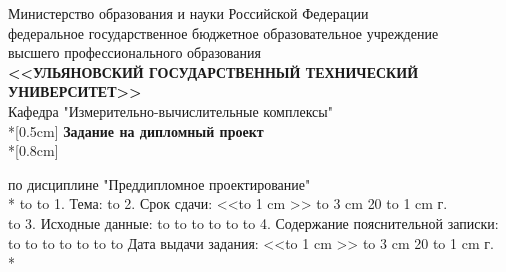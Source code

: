 \begin{titlepage}
\begin{center}
  \small
  Министерство образования и науки Российской Федерации\\
  федеральное государственное бюджетное образовательное учреждение\\
  высшего профессионального образования\\[0.5cm]
  \textbf{<<УЛЬЯНОВСКИЙ ГОСУДАРСТВЕННЫЙ ТЕХНИЧЕСКИЙ УНИВЕРСИТЕТ>>}\\[0.2cm]
  Кафедра "Измерительно-вычислительные комплексы"\\*[0.5cm]
  \normalsize
  \textbf{Задание на дипломный проект}\\*[0.8cm]
\end{center}
\small
\begin{flushleft}
по дисциплине "Преддипломное проектирование"\\*
\hbox to 
\hbox to \textwidth
{1. Тема: \hspace{1.0cm} \hrulefill}
\hbox to \textwidth {\hspace{2.7cm} \hrulefill}
2. Срок сдачи: <<{\hbox to 1 cm {\hrulefill}}>>\hspace{0.3cm} {\hbox to 3 cm {\hrulefill}} \hspace{0.2cm} {20 \hbox to 1 cm {\hrulefill} г.} \\
\hbox to \textwidth
{3. Исходные данные: \hspace{0.5cm} \hrulefill}
\hbox to \textwidth {\hrulefill}
\hbox to \textwidth {\hrulefill}
\hbox to \textwidth {\hrulefill}
\hbox to \textwidth {\hrulefill}
\hbox to \textwidth {\hrulefill}
\hbox to \textwidth
{4. Содержание пояснительной записки: \hspace{0.5cm} \hrulefill}
\hbox to \textwidth {\hrulefill}
\hbox to \textwidth {\hrulefill}
\hbox to \textwidth {\hrulefill}
\hbox to \textwidth {\hrulefill}
\hbox to \textwidth {\hrulefill}
\hbox to 
\hbox to \textwidth {}
Дата выдачи задания: <<{\hbox to 1 cm {\hrulefill}}>>\hspace{0.3cm} {\hbox to 3 cm {\hrulefill}} \hspace{0.2cm} {20 \hbox to 1 cm {\hrulefill} г.} \\*

\end{flushleft}
\end{titlepage}
